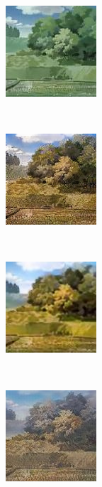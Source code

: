 \documentclass[conference]{IEEEtran}
\begin{document}
\begin{figure}[!htb]
\begin{center} %
     \begin{subfigure}[normal]{0.2\textwidth}
         \label{subfig:A}
         \includegraphics[scale = 0.7]{pic/in_2.jpg}
     \end{subfigure}
     ~
     \begin{subfigure}[normal]{0.2\textwidth}
         \label{subfig:B}
         \includegraphics[scale = 0.7]{pic/our_2.png}
     \end{subfigure}
     ~
     \begin{subfigure}[normal]{0.2\textwidth}
         \label{subfig:D}
         \includegraphics[scale = 0.7]{pic/unit_2.jpg}
     \end{subfigure}
     ~
     \begin{subfigure}[normal]{0.2\textwidth}
         \label{subfig:E}
         \includegraphics[scale = 0.94]{pic/sgan_2.jpg}
     \end{subfigure}
     \\%

\end{center}
\end{figure}
\end{document}

